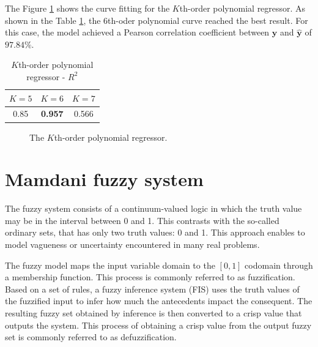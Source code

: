 \documentclass[english]{sobraep}
\begin{document}
The Figure \ref{fig:kth-order-poly} shows the curve fitting for the \(K\)th-order polynomial regressor. As shown in the Table \ref{tab:kth-order-poly-performance}, the 6th-oder polynomial curve reached the best result. For this case, the model achieved a Pearson correlation coefficient between \(\mathbf{y}\) and \(\hat{\mathbf{y}}\) of \(97.84\%\).

\begin{table}[H]
	\centering
	\caption{\(K\)th-order polynomial regressor - \(R^2\)}
	\footnotesize
	\setlength{\tabcolsep}{5pt}
	\begin{tabular}{ccc}
		\hline
		\(K = 5\) & \(K = 6\) & \(K = 7\) \\
        \hline
		0.85 & \textbf{0.957} & 0.566 \\
		\hline
	\end{tabular} \label{tab:kth-order-poly-performance}
\end{table}

\begin{figure}[H]
    

    
    \caption{The \(K\)th-order polynomial regressor.}
    \label{fig:kth-order-poly}
\end{figure}

\section{Mamdani fuzzy system}
\label{sec:mamdani}

The fuzzy system consists of a continuum-valued logic in which the truth value may be in the interval between 0 and 1. This contrasts with the so-called ordinary sets, that has only two truth values: 0 and 1. This approach enables to model vagueness or uncertainty encountered in many real problems.

The fuzzy model maps the input variable domain to the \(\left[ 0,1 \right]\) codomain through a membership function. This process is commonly referred to as fuzzification. Based on a set of rules, a fuzzy inference system (FIS) uses the truth values of the fuzzified input to infer how much the antecedents impact the consequent. The resulting fuzzy set obtained by inference is then converted to a crisp value that outputs the system. This process of obtaining a crisp value from the output fuzzy set is commonly referred to as defuzzification.
\end{document}
